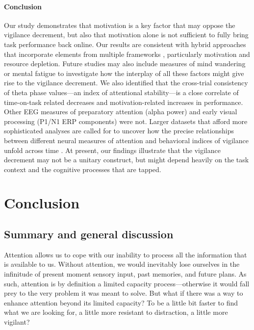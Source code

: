 \documentclass[11pt,]{memoir}
\begin{document}
\hypertarget{conclusion}{%
\subsection{Conclusion}\label{conclusion}}

Our study demonstrates that motivation is a key factor that may oppose the vigilance decrement, but also that motivation alone is not sufficient to fully bring task performance back online. Our results are consistent with hybrid approaches that incorporate elements from multiple frameworks \autocites{Christie2015}{Thomson2015}, particularly motivation and resource depletion. Future studies may also include measures of mind wandering \autocite{Smallwood2006} or mental fatigue \autocite{Johnston2018} to investigate how the interplay of all these factors might give rise to the vigilance decrement. We also identified that the cross-trial consistency of theta phase values---an index of attentional stability---is a close correlate of time-on-task related decreases and motivation-related increases in performance. Other EEG measures of preparatory attention (alpha power) and early visual processing (P1/N1 ERP components) were not. Larger datasets that afford more sophisticated analyses are called for to uncover how the precise relationships between different neural measures of attention and behavioral indices of vigilance unfold across time \autocite{Wang2018}. At present, our findings illustrate that the vigilance decrement may not be a unitary construct, but might depend heavily on the task context and the cognitive processes that are tapped.

\hypertarget{part-conclusion}{%
\part{Conclusion}\label{part-conclusion}}

\hypertarget{summary-and-general-discussion}{%
\chapter{Summary and general discussion}\label{summary-and-general-discussion}}

Attention allows us to cope with our inability to process all the information that is available to us. Without attention, we would inevitably lose ourselves in the infinitude of present moment sensory input, past memories, and future plans. As such, attention is by definition a limited capacity process---otherwise it would fall prey to the very problem it was meant to solve. But what if there was a way to enhance attention beyond its limited capacity? To be a little bit faster to find what we are looking for, a little more resistant to distraction, a little more vigilant?
\end{document}
